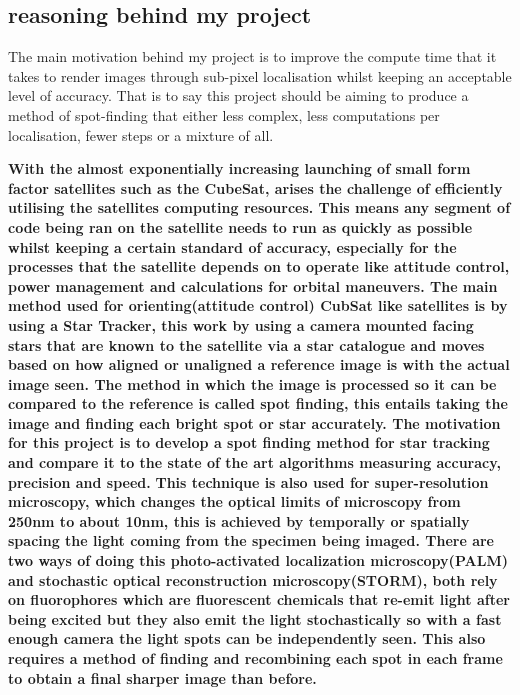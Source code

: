 \documentclass[aps,pra,a4paper,nofootinbib,onecolumn,tightenlines,longbibliography,12pt,amsfonts,amssymb,amsmath,floatfix]{revtex4-2} %
\begin{document}
  
  \subsection{reasoning behind my project} %
  \label{sub:reasoning behind my project}
  
  The main motivation behind my project is to improve the compute time that it
  takes to render images through sub-pixel localisation whilst keeping an
  acceptable level of accuracy. That is to say this project should be aiming to
  produce a method of spot-finding that either less complex, less computations
  per localisation, fewer steps or a mixture of all.

  \textbf{
  With the almost exponentially increasing launching of small form factor
  satellites such as the CubeSat, arises the challenge of efficiently utilising
  the satellites computing resources. This means any segment of code being ran on
  the satellite needs to run as quickly as possible whilst keeping a certain
  standard of accuracy, especially for the processes that the satellite depends
  on to operate like attitude control, power management and calculations for
  orbital maneuvers. The main method used for orienting(attitude control) CubSat
  like satellites is by using a Star Tracker, this work by using a camera mounted
  facing stars that are known to the satellite via a star catalogue and moves
  based on how aligned or unaligned a reference image is with the actual image
  seen.\cite{calitz2015design} The method in which the image is processed so it
  can be compared to the reference is called spot finding, this entails taking
  the image and finding each bright spot or star accurately. The motivation for
  this project is to develop a spot finding method for star tracking and compare
  it to the state of the art algorithms measuring accuracy, precision and speed.}
  \textbf{
  This technique is also used for super-resolution microscopy, which changes the
  optical limits of microscopy from 250nm to about 10nm, this is achieved by
  temporally or spatially spacing the light coming from the specimen being
  imaged. There are two ways of doing this photo-activated localization
  microscopy(PALM) and stochastic optical reconstruction microscopy(STORM), both
  rely on fluorophores which are fluorescent chemicals that re-emit light after
  being excited but they also emit the light stochastically so with a fast enough
  camera the light spots can be independently seen. This also requires a method
  of finding and recombining each spot in each frame to obtain a final sharper
  image than before.\cite{small2014fluorophore}}
  
\end{document}
